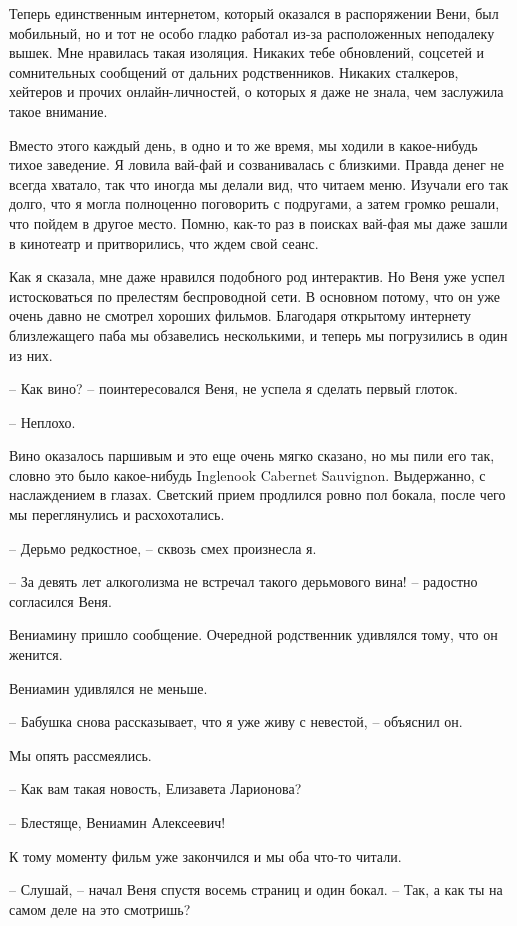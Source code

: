 \documentclass[
]{book}
\begin{document}
Теперь единственным интернетом, который оказался в распоряжении Вени, был мобильный, но и тот не особо гладко работал из-за расположенных неподалеку вышек. Мне нравилась такая изоляция. Никаких тебе обновлений, соцсетей и сомнительных сообщений от дальних родственников. Никаких сталкеров, хейтеров и прочих онлайн-личностей, о которых я даже не знала, чем заслужила такое внимание.

Вместо этого каждый день, в одно и то же время, мы ходили в какое-нибудь тихое заведение. Я ловила вай-фай и созванивалась с близкими. Правда денег не всегда хватало, так что иногда мы делали вид, что читаем меню. Изучали его так долго, что я могла полноценно поговорить с подругами, а затем громко решали, что пойдем в другое место. Помню, как-то раз в поисках вай-фая мы даже зашли в кинотеатр и притворились, что ждем свой сеанс.

Как я сказала, мне даже нравился подобного род интерактив. Но Веня уже успел истосковаться по прелестям беспроводной сети. В основном потому, что он уже очень давно не смотрел хороших фильмов. Благодаря открытому интернету близлежащего паба мы обзавелись несколькими, и теперь мы погрузились в один из них.

-- Как вино? -- поинтересовался Веня, не успела я сделать первый глоток.

-- Неплохо.

Вино оказалось паршивым и это еще очень мягко сказано, но мы пили его так, словно это было какое-нибудь Inglenook Cabernet Sauvignon. Выдержанно, с наслаждением в глазах. Светский прием продлился ровно пол бокала, после чего мы переглянулись и расхохотались.

-- Дерьмо редкостное, -- сквозь смех произнесла я.

-- За девять лет алкоголизма не встречал такого дерьмового вина! -- радостно согласился Веня.

Вениамину пришло сообщение. Очередной родственник удивлялся тому, что он женится.

Вениамин удивлялся не меньше.

-- Бабушка снова рассказывает, что я уже живу с невестой, -- объяснил он.

Мы опять рассмеялись.

-- Как вам такая новость, Елизавета Ларионова?

-- Блестяще, Вениамин Алексеевич!

К тому моменту фильм уже закончился и мы оба что-то читали.

-- Слушай, -- начал Веня спустя восемь страниц и один бокал. -- Так, а как ты на самом деле на это смотришь?
\end{document}
